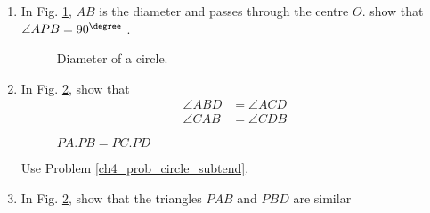 \begin{enumerate}[label=\arabic*.,ref=\thesubsection.\theenumi]
%

%
\item
In Fig. \ref{ch4_circle_dia}, $AB$ is the diameter and passes through the centre $O$.  show that $\angle APB = 90^{\degree}$ .

%
\begin{figure}[!ht]
	\begin{center}
		
		\resizebox{\columnwidth}{!}{}
	\end{center}
	\caption{Diameter of a circle.}
	\label{ch4_circle_dia}	
\end{figure}
\item
	In Fig. \ref{ch4_chord_product}, show that 
	\begin{equation}
	\begin{split}
\angle ABD &= \angle ACD \\
\angle CAB &= \angle CDB	
	\end{split}
	\end{equation}

\begin{figure}[!ht]
	\begin{center}
		
		\resizebox{\columnwidth}{!}{}
	\end{center}
	\caption{$PA.PB = PC.PD$}
	\label{ch4_chord_product}	
\end{figure}
%
%
\solution Use Problem \ref{ch4_prob_circle_subtend}.
%
\item
	In Fig. \ref{ch4_chord_product}, show that the triangles $PAB$ and $PBD$ are similar


\end{enumerate}

